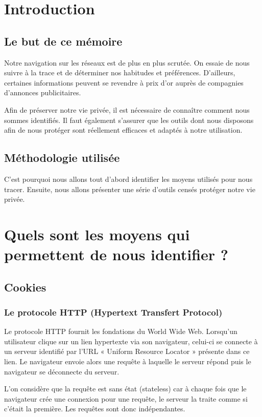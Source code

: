 \documentclass[a4paper,12pt,french]{report}
\begin{document}
\tableofcontents

\chapter{Introduction}
\section{Le but de ce mémoire}
Notre navigation sur les réseaux est de plus en plus scrutée. On essaie de nous suivre à la trace et de déterminer nos habitudes et préférences. D'ailleurs, certaines informations peuvent se revendre à prix d'or auprès de compagnies d'annonces publicitaires.

Afin de préserver notre vie privée, il est nécessaire de connaître comment nous sommes identifiés. Il faut également s'assurer que les outils dont nous disposons afin de nous protéger sont réellement efficaces et adaptés à notre utilisation.

\section{Méthodologie utilisée}
C'est pourquoi nous allons tout d'abord identifier les moyens utilisés pour nous tracer. Ensuite, nous allons présenter une série d'outils censés protéger notre vie privée.

\chapter{Quels sont les moyens qui permettent de nous identifier ?}
\section{Cookies}
\subsection{Le protocole HTTP (Hypertext Transfert Protocol)}
Le protocole HTTP fournit les fondations du World Wide Web. Lorsqu'un utilisateur clique sur un lien hypertexte via son navigateur, celui-ci se connecte à un serveur identifié par l'URL « Uniform Resource Locator » présente dans ce lien. Le navigateur envoie alors une requête à laquelle le serveur répond puis le navigateur se déconnecte du serveur.

L'on considère que la requête est sans état (stateless) car à chaque fois que le navigateur crée une connexion pour une requête, le serveur la traite comme si c'était la première. Les requêtes sont donc indépendantes.
\end{document}
